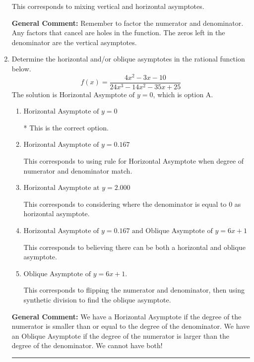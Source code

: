 \documentclass{extbook}[14pt]
\newcommand{\litem}[1]{\item #1

\rule{\textwidth}{0.4pt}}
\begin{document}
\begin{enumerate}
{\begin{enumerate}[label=\Alph*.]
This corresponds to mixing vertical and horizontal asymptotes.
\end{enumerate}

\textbf{General Comment:} Remember to factor the numerator and denominator. Any factors that cancel are holes in the function. The zeros left in the denominator are the vertical asymptotes.
}
\litem{
Determine the horizontal and/or oblique asymptotes in the rational function below.
\[ f(x) = \frac{4x^{2} -3 x -10}{24x^{3} -14 x^{2} -35 x + 25} \]The solution is \( \text{Horizontal Asymptote of } y = 0 \), which is option A.\begin{enumerate}[label=\Alph*.]
\item \( \text{Horizontal Asymptote of } y = 0 \)

* This is the correct option.
\item \( \text{Horizontal Asymptote of } y = 0.167  \)

This corresponds to using rule for Horizontal Asymptote when degree of numerator and denominator match.
\item \( \text{Horizontal Asymptote at } y = 2.000 \)

This corresponds to considering where the denominator is equal to 0 as horizontal asymptote.
\item \( \text{Horizontal Asymptote of } y = 0.167 \text{ and Oblique Asymptote of } y = 6x + 1 \)

This corresponds to believing there can be both a horizontal and oblique asymptote.
\item \( \text{Oblique Asymptote of } y = 6x + 1. \)

This corresponds to flipping the numerator and denominator, then using synthetic division to find the oblique asymptote.
\end{enumerate}

\textbf{General Comment:} We have a Horizontal Asymptote if the degree of the numerator is smaller than or equal to the degree of the denominator. We have an Oblique Asymptote if the degree of the numerator is larger than the degree of the denominator. We cannot have both!
}
\end{enumerate}
\end{document}
